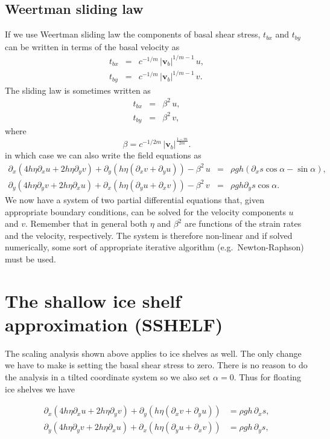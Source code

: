 \documentclass[10pt,a4paper]{book}
\newcommand{\p}{\partial}
\begin{document}
\subsection{Weertman sliding law}
If we use Weertman sliding law the components of basal shear stress, $t_{bx}$ and $t_{by}$ can
be written in terms of the basal velocity as
\begin{eqnarray}
t_{bx}&=& c^{-1/m} \, |\bm{v}_b|^{1/m-1} \, u ,\label{eq:bctx}\\
t_{by}&=& c^{-1/m} \, |\bm{v}_b|^{1/m-1} \, v .\label{eq:bcty}
\end{eqnarray}
The sliding law is sometimes written as
\begin{eqnarray}
t_{bx}&=& \beta^2 \, u ,\\
t_{by}&=& \beta^2 \,  v ,
\end{eqnarray}
where
\[
\beta= c^{-1/2m} \, |\bm{v}_b|^{\frac{1-m}{2m}}.
\]
in which case we can also write the field equations as
\begin{eqnarray} 
\p_x ( 4 h \eta \p_x u + 2 h \eta \p_y v) +\p_y ( h \eta (\p_x v + \p_y u)) - \beta^2 \, u
&=&\rho g h (\p_x s \cos \alpha  -  \sin \alpha ),\\
\p_y ( 4 h \eta \p_y v + 2 h \eta \p_x u) +\p_x ( h \eta (\p_y u + \p_x v)) - \beta^2 \, v
&=&\rho g h \p_y s \cos \alpha  .
\end{eqnarray}
We now have a system of two partial differential equations that, given
appropriate boundary conditions, can be solved for the velocity components $u$ and $v$. Remember
that in general both $\eta$ and $\beta^2$ are functions of the strain rates and the velocity,
respectively. The system is therefore non-linear and if solved numerically, some sort of appropriate
iterative algorithm (e.g.\ Newton-Raphson) must be used.



\section{The shallow ice shelf approximation (SSHELF)}
The scaling analysis shown above applies to ice shelves as well. The
only change we have to make is setting the basal shear stress to
zero. There is no reason to do the analysis in a tilted coordinate
system so we also set $\alpha=0$. Thus for floating ice shelves we have

\begin{align} 
\p_x ( 4 h \eta \p_x u + 2 h \eta \p_y v) +\p_y ( h \eta (\p_x v + \p_y u)) 
&=\rho g  h \, \p_x s  , \label{eq:ttx}\\
\p_y ( 4 h \eta \p_y v + 2 h \eta \p_x u) +\p_x ( h \eta (\p_y u + \p_x v)) 
&=\rho g  h \, \p_y s  ,
\label{eq:tty}
\end{align}
\end{document}
